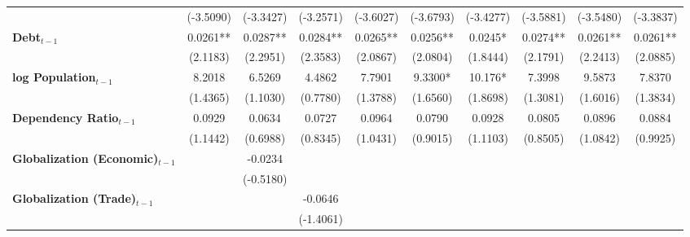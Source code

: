 \begin{center}
\begin{tabular}{lccccccccc}
\textbf{ }                         &   (-3.5090)    &    (-3.3427)     &    (-3.2571)     &    (-3.6027)     &    (-3.6793)     &    (-3.4277)     &    (-3.5881)     &    (-3.5480)     &    (-3.3837)      \\
\textbf{Debt$_{t-1}$}                &    0.0261**    &     0.0287**     &     0.0284**     &     0.0265**     &     0.0256**     &     0.0245*      &     0.0274**     &     0.0261**     &     0.0261**      \\
\textbf{ }                         &    (2.1183)    &     (2.2951)     &     (2.3583)     &     (2.0867)     &     (2.0804)     &     (1.8444)     &     (2.1791)     &     (2.2413)     &     (2.0885)      \\
\textbf{log Population$_{t-1}$}      &     8.2018     &      6.5269      &      4.4862      &      7.7901      &     9.3300*      &     10.176*      &      7.3998      &      9.5873      &      7.8370       \\
\textbf{ }                         &    (1.4365)    &     (1.1030)     &     (0.7780)     &     (1.3788)     &     (1.6560)     &     (1.8698)     &     (1.3081)     &     (1.6016)     &     (1.3834)      \\
\textbf{Dependency Ratio$_{t-1}$}   &     0.0929     &      0.0634      &      0.0727      &      0.0964      &      0.0790      &      0.0928      &      0.0805      &      0.0896      &      0.0884       \\
\textbf{ }                         &    (1.1442)    &     (0.6988)     &     (0.8345)     &     (1.0431)     &     (0.9015)     &     (1.1103)     &     (0.8505)     &     (1.0842)     &     (0.9925)      \\
\textbf{Globalization (Economic)$_{t-1}$}             &                &     -0.0234      &                  &                  &                  &                  &                  &                  &                   \\
\textbf{ }                         &                &    (-0.5180)     &                  &                  &                  &                  &                  &                  &                   \\
\textbf{Globalization (Trade)$_{t-1}$}             &                &                  &     -0.0646      &                  &                  &                  &                  &                  &                   \\
\textbf{ }                         &                &                  &    (-1.4061)     &                  &                  &                  &                  &                  &                   \\

\end{tabular}
\end{center}
